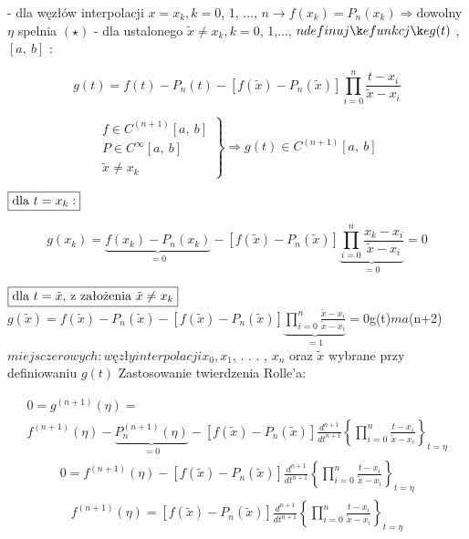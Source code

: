 \begin{frame}

- dla węzłów interpolacji $x=x_{k}, k=0$, 1, ..., $n \rightarrow f(x_{k})=P_{n}(x_{k})\Rightarrow $dowolny $\eta$ spelnia $(\star)$ \newline
- dla ustalonego $\tilde{x}\neq x_{k}, k=0$, 1,..., $n\\
definuję funkcję g(t)$ , $[a,\ b]$ :

$$g(t)=f(t)-P_{n}(t)-[f(\tilde{x})-P_{n}(\tilde{x})]\prod_{i=0}^{n}\frac{t-x_{i}}{\tilde{x}-x_{i}}$$

$$
 \left. \begin{array}{ll}
f\in C^{(n+1)}[a,\ b] \\
P\in C^{\infty}[a,\ b]\\
\tilde{x}\neq x_{k}
\end{array} \right \} \Rightarrow g(t)\in C^{(n+1)}[a,\ b]
$$

$\fbox{dla $t=x_{k}:$}$

$$g(x_{k})=\underbrace{f(x_{k})-P_{n}(x_{k})}_{=0}-[f(\tilde{x})-P_{n}(\tilde{x})]\underbrace{\prod_{i=0}^{n}\frac{x_{k}-x_{i}}{\tilde{x}-x_{i}}}_{=0}=0$$

\end{frame}

\begin{frame}
$\fbox{dla $t=\tilde{x}$, z założenia $\tilde{x} \neq x_k$}\\
$$
g(\tilde{x})=f(\tilde{x})-P_{n}(\tilde{x})-[f(\tilde{x})-P_{n}(\tilde{x})]\underbrace{\prod_{i=0}^{n}\frac{\tilde{x}-x_{i}}{\tilde{x}-x_{i}}}_{=1}=0
$$
$\Rightarrow g(t)$ ma $(n+2)$ miejsc zerowych: węzły interpolacji x_{0}, x_{1}$, . . . , $x_{n}$ oraz $\tilde{x}$ wybrane przy definiowaniu $g(t)$ \newline \newline
Zastosowanie twierdzenia Rolle'a:


$$\begin{array}{ll}
0=g^{(n+1)}(\displaystyle \eta)= \\
f^{(n+1)}(\eta)-\underbrace{P_{n}^{(n+1)}(\eta)}_{=0}-[f(\tilde{x})-P_{n}(\tilde{x})]\frac{d^{n+1}}{dt^{n+1}} \left \{\prod_{i=0}^{n}\frac{t-x_{i}}{\tilde{x}-x_{i}} \right \}_{t=\eta}  \end{array}$$
$$\begin{array}{ll}
0=f^{(n+1)}(\eta)-[f(\tilde{x})-P_{n}(\tilde{x})]\frac{d^{n+1}}{dt^{n+1}} \left \{\prod_{i=0}^{n}\frac{t-x_{i}}{\tilde{x}-x_{i}} \right \}_{t=\eta}  \end{array}$$
$$\begin{array}{ll}
f^{(n+1)}(\eta)=[f(\tilde{x})-P_{n}(\tilde{x})]\frac{d^{n+1}}{dt^{n+1}} \left \{\prod_{i=0}^{n}\frac{t-x_{i}}{\tilde{x}-x_{i}} \right \}_{t=\eta}  \end{array}$$



 \end{frame}

